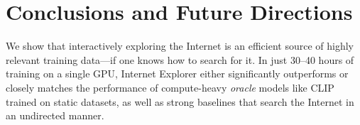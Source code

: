 \chapter{Conclusions and Future Directions}
\label{sec:conclusions}


We show that interactively exploring the Internet is an efficient source of highly relevant training data---if one knows how to search for it. In just 30--40 hours of training on a single GPU, Internet Explorer either significantly outperforms or closely matches the performance of compute-heavy \textit{oracle} models like CLIP~\cite{radford2021learning} trained on static datasets, as well as strong baselines that search the Internet in an undirected manner.





